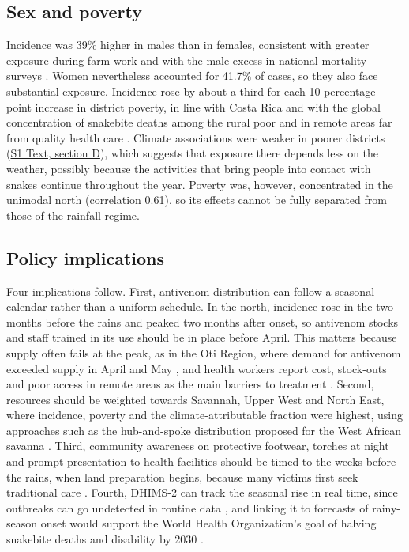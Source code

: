 \documentclass[11pt,a4paper]{article}
\begin{document}
\subsection{Sex and poverty}

Incidence was 39\% higher in males than in females, consistent with greater exposure during farm work \cite{ref6,ref63} and with the male excess in national mortality surveys \cite{ref59}. Women nevertheless accounted for 41.7\% of cases, so they also face substantial exposure. Incidence rose by about a third for each 10-percentage-point increase in district poverty, in line with Costa Rica \cite{ref9} and with the global concentration of snakebite deaths among the rural poor and in remote areas far from quality health care \cite{ref69,ref70,ref71}. Climate associations were weaker in poorer districts (\hyperref[s1text-d]{S1 Text, section D}), which suggests that exposure there depends less on the weather, possibly because the activities that bring people into contact with snakes continue throughout the year. Poverty was, however, concentrated in the unimodal north (correlation 0.61), so its effects cannot be fully separated from those of the rainfall regime.

\subsection{Policy implications}

Four implications follow. First, antivenom distribution can follow a seasonal calendar rather than a uniform schedule. In the north, incidence rose in the two months before the rains and peaked two months after onset, so antivenom stocks and staff trained in its use should be in place before April. This matters because supply often fails at the peak, as in the Oti Region, where demand for antivenom exceeded supply in April and May \cite{ref58}, and health workers report cost, stock-outs and poor access in remote areas as the main barriers to treatment \cite{ref72}. Second, resources should be weighted towards Savannah, Upper West and North East, where incidence, poverty and the climate-attributable fraction were highest, using approaches such as the hub-and-spoke distribution proposed for the West African savanna \cite{ref62,ref70}. Third, community awareness on protective footwear, torches at night and prompt presentation to health facilities should be timed to the weeks before the rains, when land preparation begins, because many victims first seek traditional care \cite{ref5,ref63}. Fourth, DHIMS-2 can track the seasonal rise in real time, since outbreaks can go undetected in routine data \cite{ref4}, and linking it to forecasts of rainy-season onset would support the World Health Organization's goal of halving snakebite deaths and disability by 2030 \cite{ref3}.
\end{document}
